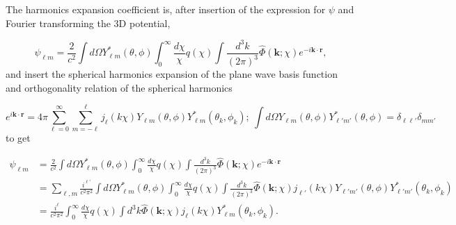 The harmonics expansion coefficient is, after insertion of the expression for $\psi$ and Fourier transforming the 3D potential,

\begin{equation}
    \label{eq:shear_pot_coeff}
    \psi_{\ell m} = \frac{2}{c^2}\int d\Omega Y^*_{\ell m}(\theta, \phi)\int_0^\infty \frac{d\chi}{\chi}q(\chi)\int\frac{d^3k}{(2\pi)^3}\hat{\Phi}(\bm{k};\chi)e^{-i\bm{k}\cdot\bm{r}},
\end{equation}
and insert the spherical harmonics expansion of the plane wave basis function and orthogonality relation of the spherical harmonics

\begin{equation}
    \label{eq:shear_SHE&ortho}
    e^{i\bm{k}\cdot\bm{r}} = 4\pi\sum_{\ell=0}^\infty\sum_{m=-\ell}^\ell  j_\ell(k\chi) Y_{\ell m}(\theta, \phi) Y^*_{\ell m}(\theta_k, \phi_k); ~ \int d\Omega Y_{\ell m}(\theta, \phi) Y^*_{\ell' m'}(\theta, \phi) = \delta_{\ell \ell'}\delta_{mm'}
\end{equation}
to get

\begin{align}
    \nonumber \psi_{\ell m} &= \frac{2}{c^2}\int d\Omega Y^*_{\ell m}(\theta, \phi)\int_0^\infty \frac{d\chi}{\chi}q(\chi)\int\frac{d^3k}{(2\pi)^3}\hat{\Phi}(\bm{k};\chi)e^{-i\bm{k}\cdot\bm{r}} \\
    &= \nonumber \sum_{\ell,m}\frac{i^{\ell'}}{c^2\pi^2}\int d\Omega Y^*_{\ell m}(\theta, \phi)\int_0^\infty \frac{d\chi}{\chi}q(\chi)\int\frac{d^3k}{(2\pi)^3}\hat{\Phi}(\bm{k};\chi) j_{\ell'}(k\chi) Y_{\ell' m'}(\theta, \phi) Y^*_{\ell' m'}(\theta_k, \phi_k)\\
    &= \frac{i^\ell}{c^2 \pi^2} \int_0^\infty \frac{d\chi}{\chi}q(\chi)\int d^3k\hat{\Phi}(\bm{k};\chi) j_{\ell}(k\chi) Y^*_{\ell m}(\theta_k, \phi_k).
\end{align}

